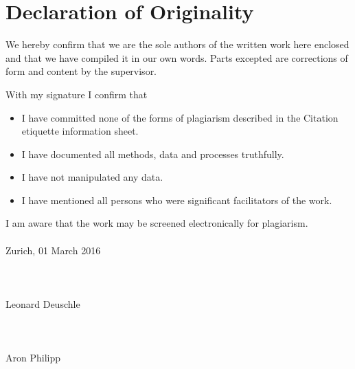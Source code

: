 \chapter{Declaration of Originality}

We hereby confirm that we are the sole authors of the written work here enclosed and that we have compiled it in our own words. Parts excepted are corrections of form and content by the supervisor.

With my signature I confirm that 
\begin{itemize}

\item I have committed none of the forms of plagiarism described in the Citation etiquette information sheet.
\item I have documented all methods, data and processes truthfully.
\item I have not manipulated any data.
\item I have mentioned all persons who were significant facilitators of the work.


\end{itemize}
I am aware that the work may be screened electronically for plagiarism. \\ 
\\
Zurich, 01 March 2016
\\
\\
\\
\\
Leonard Deuschle 
\\
\\ 
\\
\\ 
Aron Philipp